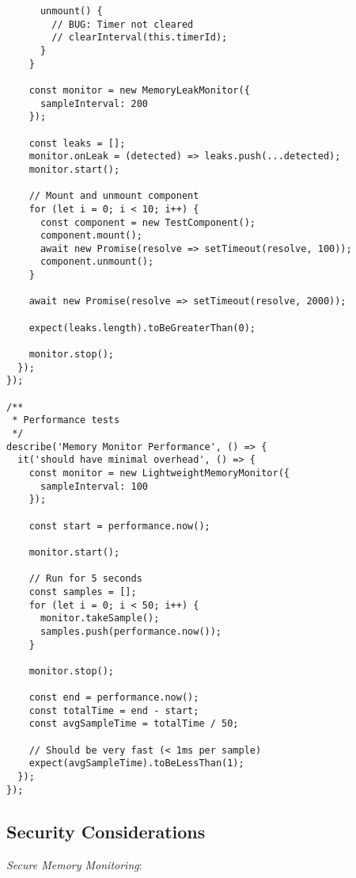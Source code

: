 \documentclass[11pt]{article}
\begin{document}
\begin{verbatim}
      unmount() {
        // BUG: Timer not cleared
        // clearInterval(this.timerId);
      }
    }
    
    const monitor = new MemoryLeakMonitor({
      sampleInterval: 200
    });
    
    const leaks = [];
    monitor.onLeak = (detected) => leaks.push(...detected);
    monitor.start();
    
    // Mount and unmount component
    for (let i = 0; i < 10; i++) {
      const component = new TestComponent();
      component.mount();
      await new Promise(resolve => setTimeout(resolve, 100));
      component.unmount();
    }
    
    await new Promise(resolve => setTimeout(resolve, 2000));
    
    expect(leaks.length).toBeGreaterThan(0);
    
    monitor.stop();
  });
});

/**
 * Performance tests
 */
describe('Memory Monitor Performance', () => {
  it('should have minimal overhead', () => {
    const monitor = new LightweightMemoryMonitor({
      sampleInterval: 100
    });
    
    const start = performance.now();
    
    monitor.start();
    
    // Run for 5 seconds
    const samples = [];
    for (let i = 0; i < 50; i++) {
      monitor.takeSample();
      samples.push(performance.now());
    }
    
    monitor.stop();
    
    const end = performance.now();
    const totalTime = end - start;
    const avgSampleTime = totalTime / 50;
    
    // Should be very fast (< 1ms per sample)
    expect(avgSampleTime).toBeLessThan(1);
  });
});
\end{verbatim}
\subsection{Security Considerations}
\label{sec:orgd15fc3c}

\emph{Secure Memory Monitoring}:
\end{document}
